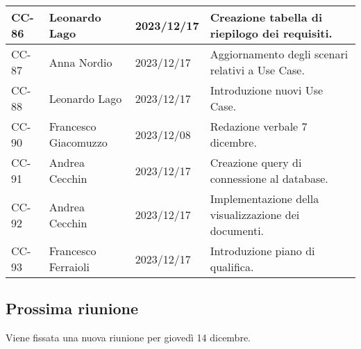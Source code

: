 {\begin{xltabular}{\textwidth}{| l | l | l | X |}
        CC-86 & Leonardo Lago & 2023/12/17 & Creazione tabella di riepilogo dei requisiti. \\
        \hline
        CC-87 & Anna Nordio & 2023/12/17 & Aggiornamento degli scenari relativi a Use Case. \\
        \hline
        CC-88 & Leonardo Lago & 2023/12/17 & Introduzione nuovi Use Case. \\
        \hline
        CC-90 & Francesco Giacomuzzo & 2023/12/08 & Redazione verbale 7 dicembre. \\
        \hline
        CC-91 & Andrea Cecchin & 2023/12/17 & Creazione query di connessione al database. \\
        \hline
        CC-92 & Andrea Cecchin & 2023/12/17 & Implementazione della visualizzazione dei documenti. \\
        \hline 
        CC-93 & Francesco Ferraioli & 2023/12/17 & Introduzione piano di qualifica. \\
        \hline
    \end{xltabular}
}


\subsection{Prossima riunione} \label{subsec:riunione}
Viene fissata una nuova riunione per giovedì 14 dicembre.